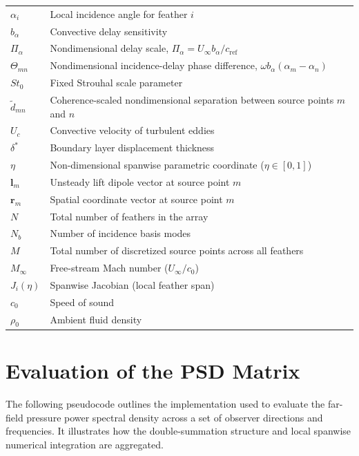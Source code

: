 \documentclass[11pt]{article}
\newcommand{\vect}[1]{\bm{#1}}
\begin{document}
\begin{longtable}{@{}L{0.15\textwidth}L{0.8\textwidth}@{}}
$\alpha_i$ & Local incidence angle for feather $i$ \\
$b_\alpha$ & Convective delay sensitivity \\
$\Pi_\alpha$ & Nondimensional delay scale, $\Pi_\alpha = U_\infty b_\alpha / c_{\mathrm{ref}}$ \\
$\Theta_{mn}$ & Nondimensional incidence-delay phase difference, $\omega b_\alpha(\alpha_m-\alpha_n)$ \\
$\mathit{St}_0$ & Fixed Strouhal scale parameter \\
$\tilde{d}_{mn}$ & Coherence-scaled nondimensional separation between source points $m$ and $n$ \\
$U_c$ & Convective velocity of turbulent eddies \\
$\delta^*$ & Boundary layer displacement thickness \\
$\eta$ & Non-dimensional spanwise parametric coordinate ($\eta \in [0, 1]$) \\
$\vect{l}_m$ & Unsteady lift dipole vector at source point $m$ \\
$\vect{r}_m$ & Spatial coordinate vector at source point $m$ \\
$N$ & Total number of feathers in the array \\
$N_b$ & Number of incidence basis modes \\
$M$ & Total number of discretized source points across all feathers \\
$M_\infty$ & Free-stream Mach number ($U_\infty / c_0$) \\
$J_i(\eta)$ & Spanwise Jacobian (local feather span) \\
$c_0$ & Speed of sound \\
$\rho_0$ & Ambient fluid density \\
\end{longtable}

\section{Evaluation of the PSD Matrix}

The following pseudocode outlines the implementation used to evaluate the far-field pressure power spectral density across a set of observer directions and frequencies. It illustrates how the double-summation structure and local spanwise numerical integration are aggregated.
\end{document}
